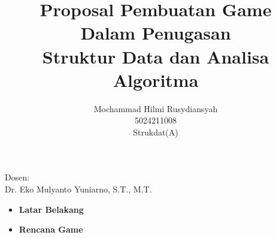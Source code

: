 \documentclass[12pt]{extarticle}
\title{Proposal Pembuatan Game\\Dalam Penugasan\\Struktur Data dan Analisa Algoritma}
\author{Mochammad Hilmi Rusydiansyah\\5024211008\\Strukdat(A)}
\begin{document}
	
	\maketitle
	\begin{center}
		\large{
			Dosen:
			\\
			Dr. Eko Mulyanto Yuniarno, S.T., M.T.
		}
	\end{center}
	\newpage
	
	\begin{itemize}
		\item \textbf{Latar Belakang}
		\item \textbf{Rencana Game}
	\end{itemize}
	
	
\end{document}
